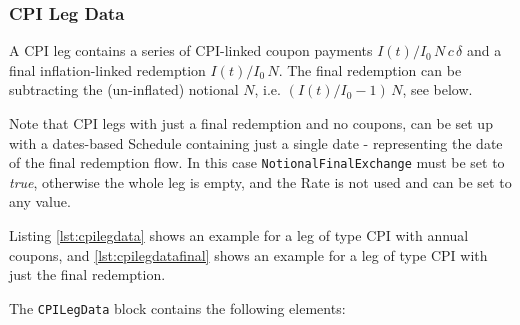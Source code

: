 \subsubsection{CPI Leg Data}
\label{ss:cpilegdata}

A CPI leg contains a series of CPI-linked coupon payments $I(t)/I_0\,N\,c\,\delta$ and a final
inflation-linked redemption $I(t)/I_0\,N$. The final redemption can be
subtracting the (un-inflated) notional $N$, i.e. $(I(t)/I_0-1)\,N$,
see below.

Note that CPI legs with just a final redemption and no coupons, can be set up with a dates-based Schedule containing just a single date - representing the date of the final redemption flow. In this case \lstinline!NotionalFinalExchange! must be set to \emph{true}, otherwise the whole leg is empty, and the Rate is not used and can be set to any value. 

Listing \ref{lst:cpilegdata} shows an example for a leg of type CPI with annual coupons, and \ref{lst:cpilegdatafinal} shows an example for a leg of type CPI with just the final redemption. 

The  \lstinline!CPILegData! block contains the following elements:

